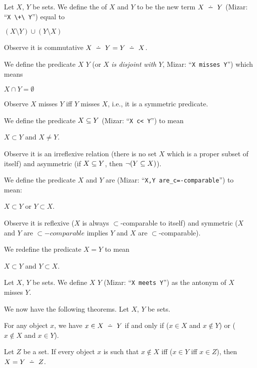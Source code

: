 \documentclass{article}
\begin{document}
\begin{definition}
Let $X$, $Y$ be sets. We define the  of $X$
and $Y$ to be the new term $X\symdiff Y$ (Mizar: ``\verb#X \+\ Y#'') equal to
\begin{defn}
\item $(X\setminus Y)\cup(Y\setminus X)$
\end{defn}
Observe it is commutative $X\symdiff Y=Y\symdiff X$.

We define the predicate $X$  $Y$ (or $X$ \emph{is disjoint with} $Y$, Mizar: ``\verb#X misses Y#'')
which means
\begin{defn}
\item $X\cap Y=\emptyset$
\end{defn}
Observe $X$ misses $Y$ iff $Y$ misses $X$, i.e., it is a symmetric predicate.

We define the predicate $X\properSubset Y$ (Mizar: ``\verb#X c< Y#'')
to mean
\begin{defn}
\item $X\subset Y$ and $X\neq Y$.
\end{defn}
Observe it is an irreflexive relation (there is no set $X$ which is a
proper subset of itself) and asymmetric (if $X\properSubset Y$, then
$\neg(Y\properSubset X)$).

We define the predicate $X$ and $Y$ are 
(Mizar: ``\verb#X,Y are_c=-comparable#'') to mean:
\begin{defn}
\item $X\subset Y$ or $Y\subset X$.
\end{defn}
Observe it is reflexive ($X$ is always $\subset$-comparable to itself)
and symmetric ($X$ and $Y$ are $\subset-comparable$ implies $Y$ and $X$
are $\subset$-comparable).

We redefine the predicate $X=Y$ to mean
\begin{defn}
\item $X\subset Y$ and $Y\subset X$.
\end{defn}
\end{definition}

\begin{definition}
Let $X$, $Y$ be sets. We define $X$  $Y$ (Mizar:
``\verb#X meets Y#'') as the antonym of $X$ misses $Y$.
\end{definition}

We now have the following theorems. Let $X$, $Y$ be sets.

\begin{thm}
\item For any object $x$, we have $x\in X\symdiff Y$ if and only if
  ($x\in X$ and $x\notin Y$) or ($x\notin X$ and $x\in Y$).
\item Let $Z$ be a set. If every object $x$ is such that $x\notin X$ iff
  ($x\in Y$ iff $x\in Z$), then $X=Y\symdiff Z$.
\end{thm}
\end{document}
